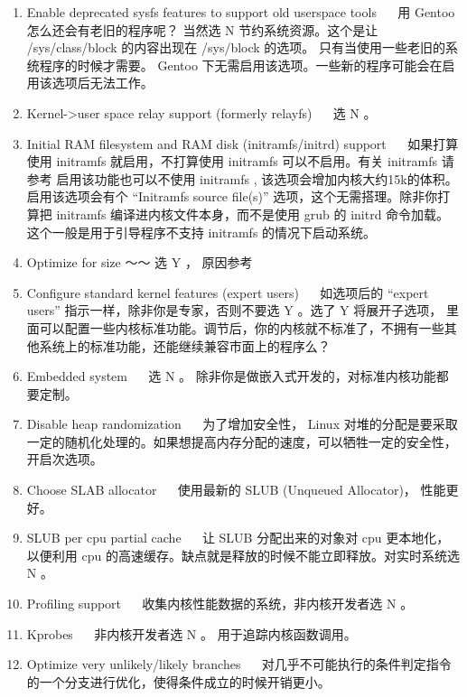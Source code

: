 \begin{enumerate}
\item Enable deprecated sysfs features to support old userspace tools ~~ 用 Gentoo 怎么还会有老旧的程序呢？ 当然选 N 节约系统资源。这个是让  /sys/class/block 的内容出现在 /sys/block 的选项。 只有当使用一些老旧的系统程序的时候才需要。 Gentoo 下无需启用该选项。一些新的程序可能会在启用该选项后无法工作。

\item Kernel->user space relay support (formerly relayfs)  ~~ 选 N 。 


\item  Initial RAM filesystem and RAM disk (initramfs/initrd) support ~~ 如果打算使用 initramfs 就启用，不打算使用 initramfs 可以不启用。有关 initramfs 请参考  启用该功能也可以不使用 initramfs , 该选项会增加内核大约15k的体积。启用该选项会有个 “Initramfs source file(s)” 选项，这个无需搭理。除非你打算把 initramfs 编译进内核文件本身，而不是使用 grub 的 initrd 命令加载。这个一般是用于引导程序不支持 initramfs 的情况下启动系统。

\item Optimize for size  ～～  选 Y ， 原因参考   

\item Configure standard kernel features (expert users) ~~ 如选项后的 “expert users” 指示一样，除非你是专家，否则不要选 Y 。选了 Y 将展开子选项， 里面可以配置一些内核标准功能。调节后，你的内核就不标准了，不拥有一些其他系统上的标准功能，还能继续兼容市面上的程序么？

\item Embedded system ~~ 选 N 。 除非你是做嵌入式开发的，对标准内核功能都要定制。

\item Disable heap randomization ~~ 为了增加安全性， Linux 对堆的分配是要采取一定的随机化处理的。如果想提高内存分配的速度，可以牺牲一定的安全性，开启次选项。

\item Choose SLAB allocator ~~ 使用最新的  SLUB (Unqueued Allocator)， 性能更好。

\item SLUB per cpu partial cache ~~ 让 SLUB 分配出来的对象对 cpu 更本地化，以便利用 cpu 的高速缓存。缺点就是释放的时候不能立即释放。对实时系统选 N 。

\item Profiling support ~~ 收集内核性能数据的系统，非内核开发者选 N 。

\item Kprobes ~~ 非内核开发者选 N 。 用于追踪内核函数调用。

\item Optimize very unlikely/likely branches ~~ 对几乎不可能执行的条件判定指令的一个分支进行优化，使得条件成立的时候开销更小。
\end{enumerate}


